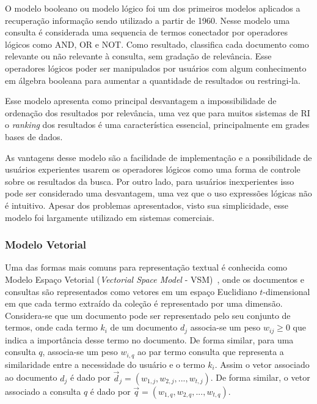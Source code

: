 O modelo booleano ou modelo lógico foi um dos primeiros modelos aplicados a recuperação informação sendo utilizado a partir de 1960. Nesse modelo uma consulta é considerada uma sequencia de termos conectador por operadores lógicos como AND, OR e NOT. Como resultado, classifica cada documento como relevante ou não relevante à consulta, sem gradação de relevância. Esse operadores lógicos poder ser manipulados por usuários com algum conhecimento em álgebra booleana para aumentar a quantidade de resultados ou restringi-la.

Esse modelo apresenta como principal desvantagem a impossibilidade de ordenação dos resultados por relevância, uma vez que para muitos sistemas de RI o \textit{ranking} dos resultados é uma característica essencial, principalmente em grades bases de dados. 

As vantagens desse modelo são a facilidade de implementação e a possibilidade de usuários experientes usarem os operadores lógicos como uma forma de controle sobre os resultados da busca. Por outro lado, para usuários inexperientes isso pode ser considerado uma desvantagem, uma vez que o uso expressões lógicas não é intuitivo. Apesar dos problemas apresentados, visto sua simplicidade, esse modelo foi largamente utilizado em sistemas comerciais. 



\subsubsection{Modelo Vetorial}


Uma das formas mais comuns para representação textual é conhecida como Modelo Espaço Vetorial (\textit{Vectorial Space Model} - VSM)~\cite{Rezende2003}, onde os documentos e consultas são representados como vetores em um espaço Euclidiano $t$-dimensional em que cada termo extraído da coleção é representado por uma dimensão. 
% 
Considera-se que um documento pode ser representado pelo seu conjunto de termos, onde cada termo $k_i$ de um documento $d_j$ associa-se um peso $w_{ij}\geq0$ que indica a importância desse termo no documento. 
%
De forma similar, para uma consulta $q$, associa-se um peso $w_{i,q}$ ao par termo consulta que representa a similaridade entre a necessidade do usuário e o termo $k_i$. 
%
Assim o vetor associado ao documento $d_j$ é dado por $\vec{d}_{j} = (w_{1,j}, w_{2,j}, ..., w_{t,j})$. 
%
De forma similar, o vetor associado a consulta $q$ é dado por $\vec{q} = (w_{1,q}, w_{2,q}, ..., w_{t,q})$.


